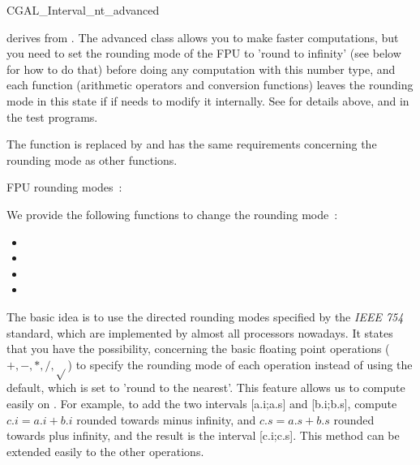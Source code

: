 \begin{ccAdvanced}

\begin{ccClass} {CGAL_Interval_nt_advanced}
\label{interval-adv}

 derives from .
The advanced class allows you to make faster computations, but you need to set
the rounding mode of the FPU to 'round to infinity' (see below for how to do
that) before doing any computation with this number type, and each function
(arithmetic operators and conversion functions)
leaves the rounding mode in this state if if needs to modify it internally.
See for details above, and in the test programs.


The function  is replaced by
 and has the same
requirements concerning the rounding mode as other functions.


FPU rounding modes~:

We provide the following functions to change the rounding mode~:
\begin{itemize}
\item {}
\item {}
\item {}
\item {}
\end{itemize}

\ccImplementation

The basic idea is to use the directed rounding modes specified by the 
{\it IEEE 754} standard, which are implemented by almost all processors 
nowadays.
It states that you have the possibility, concerning the basic floating point
operations ($+,-,*,/,\sqrt{}$) to specify the rounding mode of each operation
instead of using the default, which is set to 'round to the nearest'.
This feature allows us to compute easily on .  For example, to
add the two intervals [a.i;a.s] and [b.i;b.s], compute $c.i=a.i+b.i$ rounded
towards minus infinity, and $c.s=a.s+b.s$ rounded towards plus infinity, and
the result is the interval [c.i;c.s].  This method can be extended easily to
the other operations.


\end{ccClass}
\end{ccAdvanced}
